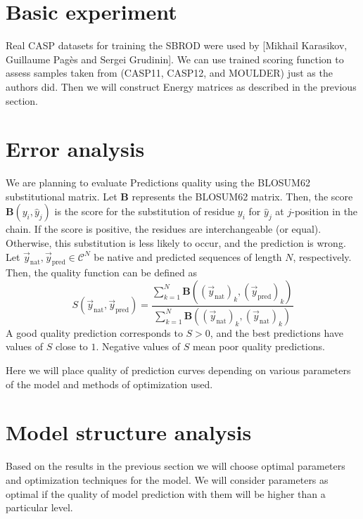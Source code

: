 \documentclass[12pt,twoside]{article}
\begin{document}
\section{Basic experiment}
Real CASP datasets for training the SBROD were used by [Mikhail Karasikov, Guillaume Pagès and Sergei Grudinin]. We can use trained scoring function to assess samples taken from (CASP11, CASP12, and MOULDER) just as the authors did. Then we will construct Energy matrices as described in the previous section.
\section{Error analysis}
We are planning to evaluate Predictions quality using the BLOSUM62 \cite{Henikoff92} substitutional matrix.
Let $\mathbf{B}$ represents the BLOSUM62 matrix. Then, the score $\mathbf{B}(y_i, \hat{y}_j)$ is the score for the substitution of residue $y_i$ for $\hat{y}_j$ at $j$-position in the chain. If the score is positive, the residues are interchangeable (or equal). Otherwise, this substitution is less likely to occur, and the prediction is wrong. Let $\vec{y}_\text{nat}, \vec{y}_\text{pred} \in \mathcal{C}^N$ be native and predicted sequences of length $N$, respectively. Then, the quality function can be defined as
\begin{equation}
\label{QUAL}
S(\vec{y}_\text{nat}, \vec{y}_\text{pred}) = \dfrac{\sum_{k= 1}^{N} \mathbf{B}((\vec{y}_\text{nat})_k, (\vec{y}_\text{pred})_k)}{\sum_{k= 1}^{N} \mathbf{B}((\vec{y}_\text{nat})_k, (\vec{y}_\text{nat})_k)} 
\end{equation}
%
A good quality prediction corresponds to $S > 0$, and the best predictions have values of $S$ close to $1$. Negative values of $S$ mean poor quality predictions.\par
Here we will place quality of prediction curves depending on various parameters of the model and methods of optimization used.


\section{Model structure analysis}

Based on the results in the previous section we will choose optimal parameters and optimization techniques for the model. We will consider parameters as optimal if the quality of model prediction with them will be higher than a particular level.  
\end{document}
